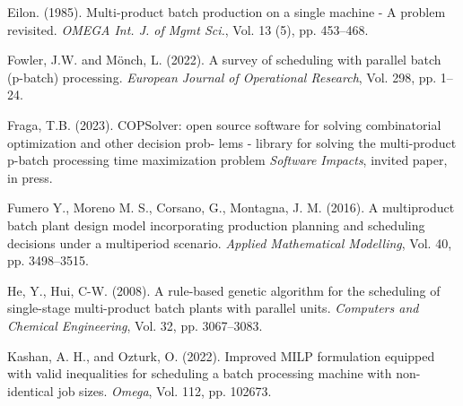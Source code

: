 \documentclass[authoryear,manuscript,12pt]{elsarticle}
\begin{document}



\begin{thebibliography}{1}


Eilon. (1985). Multi-product batch production on a single machine - A problem revisited. {\it OMEGA Int. J. of Mgmt Sci.}, Vol. 13 (5), pp. 453--468.

Fowler, J.W. and Mönch, L. (2022). A survey of scheduling with parallel batch (p-batch) processing. {\it European Journal of Operational Research}, Vol. 298, pp. 1--24.

Fraga, T.B. (2023). COPSolver: open source software for solving combinatorial optimization and other decision prob-
lems - library for solving the multi-product p-batch processing time maximization problem {\it Software Impacts}, invited paper, in press.

Fumero Y., Moreno M. S., Corsano, G., Montagna, J. M. (2016). A multiproduct batch plant design model incorporating production planning and scheduling decisions under a multiperiod scenario. {\it Applied Mathematical Modelling}, Vol. 40, pp. 3498--3515.

He, Y., Hui, C-W. (2008). A rule-based genetic algorithm for the scheduling of single-stage multi-product batch plants with parallel units. {\it  Computers and Chemical Engineering}, Vol. 32, pp. 3067--3083.

Kashan, A. H., and Ozturk, O. (2022). Improved MILP formulation equipped with valid inequalities for scheduling a batch processing machine with non-identical job sizes. {\it  Omega}, Vol. 112, pp. 102673.


\end{thebibliography}
\end{document}
